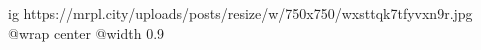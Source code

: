  
 
 
 
 

\ifcmt
  ig https://mrpl.city/uploads/posts/resize/w/750x750/wxsttqk7tfyvxn9r.jpg
  @wrap center
  @width 0.9
\fi

